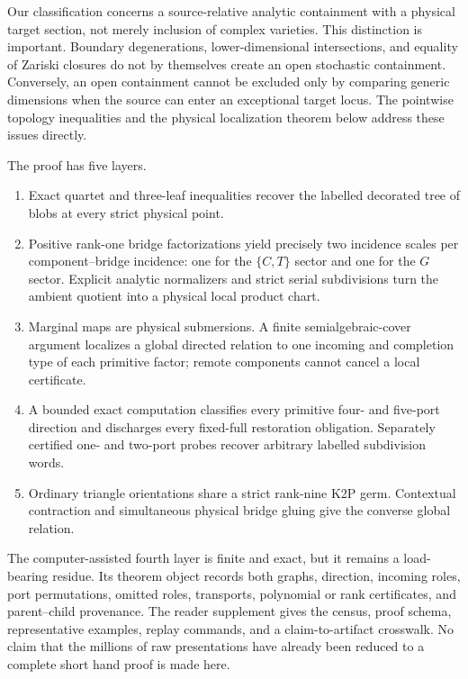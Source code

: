 \documentclass[11pt]{article}
\theoremstyle{remark}
\newcommand{\1}{\mathbf 1}
\begin{document}
Our classification concerns a source-relative analytic containment with a
physical target section, not merely inclusion of complex varieties.  This
distinction is important.  Boundary degenerations, lower-dimensional
intersections, and equality of Zariski closures do not by themselves create
an open stochastic containment.  Conversely, an open containment cannot be
excluded only by comparing generic dimensions when the source can enter an
exceptional target locus.  The pointwise topology inequalities and the
physical localization theorem below address these issues directly.

The proof has five layers.
\begin{enumerate}[label=\textbf{L\arabic*.}]
  \item Exact quartet and three-leaf inequalities recover the labelled
        decorated tree of blobs at every strict physical point.
  \item Positive rank-one bridge factorizations yield precisely two
        incidence scales per component--bridge incidence: one for the
        \(\{C,T\}\) sector and one for the \(G\) sector.  Explicit analytic
        normalizers and strict serial subdivisions turn the ambient quotient
        into a physical local product chart.
  \item Marginal maps are physical submersions.  A finite semialgebraic-cover
        argument localizes a global directed relation to one incoming and
        completion type of each primitive factor; remote components cannot
        cancel a local certificate.
  \item A bounded exact computation classifies every primitive four- and
        five-port direction and discharges every fixed-full restoration
        obligation.  Separately certified one- and two-port probes recover
        arbitrary labelled subdivision words.
  \item Ordinary triangle orientations share a strict rank-nine K2P germ.
        Contextual contraction and simultaneous physical bridge gluing give
        the converse global relation.
\end{enumerate}

The computer-assisted fourth layer is finite and exact, but it remains a
load-bearing residue.  Its theorem object records both graphs, direction,
incoming roles, port permutations, omitted roles, transports, polynomial or
rank certificates, and parent--child provenance.  The reader supplement gives
the census, proof schema, representative examples, replay commands, and a
claim-to-artifact crosswalk.  No claim that the millions of raw presentations
have already been reduced to a complete short hand proof is made here.
\end{document}
